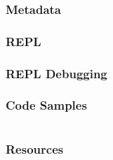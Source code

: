 \documentclass{beamer}
\begin{document}
\begin{frame}
  \frametitle{Metadata}

\end{frame}

\begin{frame}
  \frametitle{REPL}
%
\end{frame}

\begin{frame}
  \frametitle{REPL Debugging}
%

\end{frame}

\begin{frame}
  \frametitle{Code Samples} 
  \inputminted{clojure}{src/xml-parse.clj}
\end{frame}  

\begin{frame}
  \frametitle{Resources}
\end{frame}

% 
%
\end{document}
